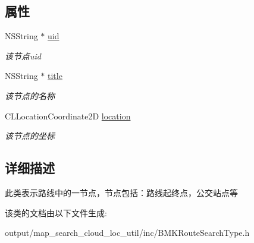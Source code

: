 \subsection*{属性}
\begin{DoxyCompactItemize}
\item 
\hypertarget{interface_b_m_k_route_node_aaa2aba77525dedcf747e2b3073d0b178}{N\+S\+String $\ast$ \hyperlink{interface_b_m_k_route_node_aaa2aba77525dedcf747e2b3073d0b178}{uid}}\label{interface_b_m_k_route_node_aaa2aba77525dedcf747e2b3073d0b178}

\begin{DoxyCompactList}\small\item\em 该节点uid \end{DoxyCompactList}\item 
\hypertarget{interface_b_m_k_route_node_a911fa36be5587e1bd9abb6bd9c4e6c2b}{N\+S\+String $\ast$ \hyperlink{interface_b_m_k_route_node_a911fa36be5587e1bd9abb6bd9c4e6c2b}{title}}\label{interface_b_m_k_route_node_a911fa36be5587e1bd9abb6bd9c4e6c2b}

\begin{DoxyCompactList}\small\item\em 该节点的名称 \end{DoxyCompactList}\item 
\hypertarget{interface_b_m_k_route_node_a4e3c2a31a2293b6f600f3b4f9a52a722}{C\+L\+Location\+Coordinate2\+D \hyperlink{interface_b_m_k_route_node_a4e3c2a31a2293b6f600f3b4f9a52a722}{location}}\label{interface_b_m_k_route_node_a4e3c2a31a2293b6f600f3b4f9a52a722}

\begin{DoxyCompactList}\small\item\em 该节点的坐标 \end{DoxyCompactList}\end{DoxyCompactItemize}


\subsection{详细描述}
此类表示路线中的一节点，节点包括：路线起终点，公交站点等 

该类的文档由以下文件生成\+:\begin{DoxyCompactItemize}
\item 
output/map\+\_\+search\+\_\+cloud\+\_\+loc\+\_\+util/inc/B\+M\+K\+Route\+Search\+Type.\+h\end{DoxyCompactItemize}
